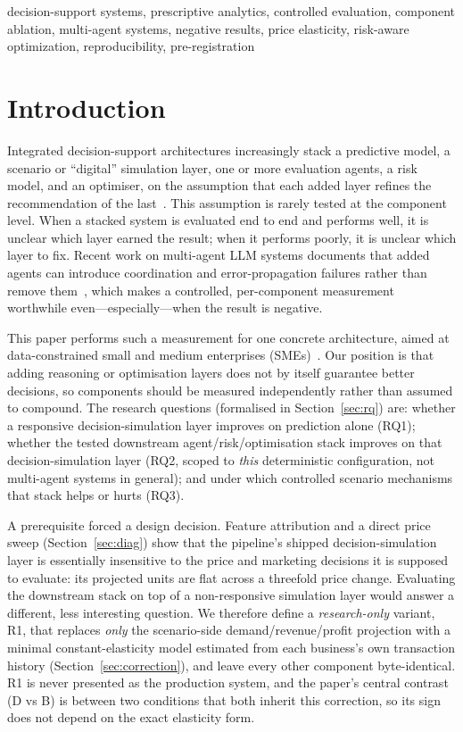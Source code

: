 \documentclass[conference]{IEEEtran}
\begin{document}
\begin{IEEEkeywords}
decision-support systems, prescriptive analytics, controlled evaluation,
component ablation, multi-agent systems, negative results, price elasticity,
risk-aware optimization, reproducibility, pre-registration
\end{IEEEkeywords}

\section{Introduction}
Integrated decision-support architectures increasingly stack a predictive model,
a scenario or ``digital'' simulation layer, one or more evaluation agents, a
risk model, and an optimiser, on the assumption that each added layer refines
the recommendation of the last~\cite{Lepenioti2020,Arnott2014}. This assumption
is rarely tested at the component level. When a stacked system is evaluated end
to end and performs well, it is unclear which layer earned the result; when it
performs poorly, it is unclear which layer to fix. Recent work on multi-agent
LLM systems documents that added agents can introduce coordination and
error-propagation failures rather than remove
them~\cite{Wang2024,Smit2024,Huang2024,Cemri2025}, which makes a controlled,
per-component measurement worthwhile even---especially---when the result is
negative.

This paper performs such a measurement for one concrete architecture, aimed at
data-constrained small and medium enterprises (SMEs)~\cite{OECD2021,Buteau2021}.
Our position is that adding reasoning or optimisation layers does not by itself
guarantee better decisions, so components should be measured independently rather
than assumed to compound. The research questions (formalised in
Section~\ref{sec:rq}) are: whether a responsive decision-simulation layer
improves on prediction alone (RQ1); whether the tested downstream
agent/risk/optimisation stack improves on that decision-simulation layer (RQ2,
scoped to \emph{this} deterministic configuration, not multi-agent systems in
general); and under which controlled scenario mechanisms that stack helps or
hurts (RQ3).

A prerequisite forced a design decision. Feature attribution and a direct price
sweep (Section~\ref{sec:diag}) show that the pipeline's shipped
decision-simulation layer is essentially insensitive to the price and marketing
decisions it is supposed to evaluate: its projected units are flat across a
threefold price change. Evaluating the downstream stack on top of a
non-responsive simulation layer would answer a different, less interesting
question. We therefore define a \emph{research-only} variant, R1, that replaces
\emph{only} the scenario-side demand/revenue/profit projection with a minimal
constant-elasticity model estimated from each business's own transaction history
(Section~\ref{sec:correction}), and leave every other component byte-identical.
R1 is never presented as the production system, and the paper's central contrast
(D vs B) is between two conditions that both inherit this correction, so its sign
does not depend on the exact elasticity form.
\end{document}
